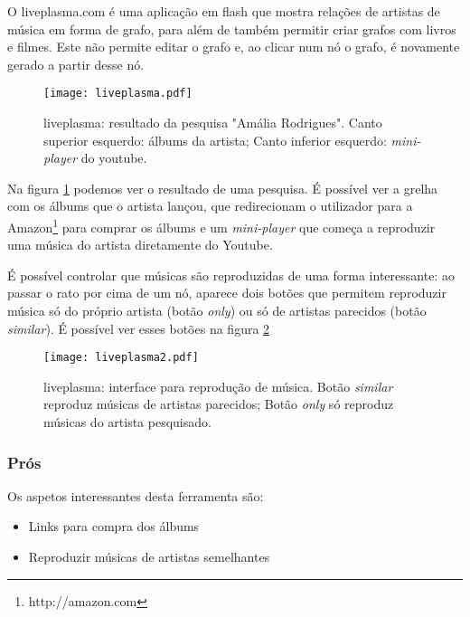 O liveplasma.com é uma aplicação em flash que mostra relações de artistas de música em forma de grafo, para além de também permitir criar grafos com livros e filmes.
Este não permite editar o grafo e, ao clicar num nó o grafo, é novamente gerado a partir desse nó.

\begin{figure}[tb]
  \begin{center}
    \texttt{[image: liveplasma.pdf]}
  \end{center}
  \caption{liveplasma: resultado da pesquisa "Amália Rodrigues". Canto superior esquerdo: álbums da artista; Canto inferior esquerdo: \emph{mini-player} do youtube.}
  \label{fig:sota_liveplasma}
\end{figure}

Na figura \ref{fig:sota_liveplasma} podemos ver o resultado de uma pesquisa.
É possível ver a grelha com os álbums que o artista lançou, que redirecionam o utilizador para a Amazon\footnote{http://amazon.com} para comprar os álbums e um \emph{mini-player} que começa a reproduzir uma música do artista diretamente do Youtube.

É possível controlar que músicas são reproduzidas de uma forma interessante: ao passar o rato por cima de um nó, aparece dois botões que permitem reproduzir música só do próprio artista (botão \emph{only}) ou só de artistas parecidos (botão \emph{similar}).
É possível ver esses botões na figura \ref{fig:sota_liveplasma2}

\begin{figure}[tb]
  \begin{center}
    \texttt{[image: liveplasma2.pdf]}
  \end{center}
  \caption{liveplasma: interface para reprodução de música. Botão \emph{similar} reproduz músicas de artistas parecidos; Botão \emph{only} só reproduz músicas do artista pesquisado.}
  \label{fig:sota_liveplasma2}
\end{figure}

\subsubsection{Prós} %
\label{ssub:liveplasma_pros}

Os aspetos interessantes desta ferramenta são:

\begin{itemize}
  \item Links para compra dos álbums
  \item Reproduzir músicas de artistas semelhantes
\end{itemize}


